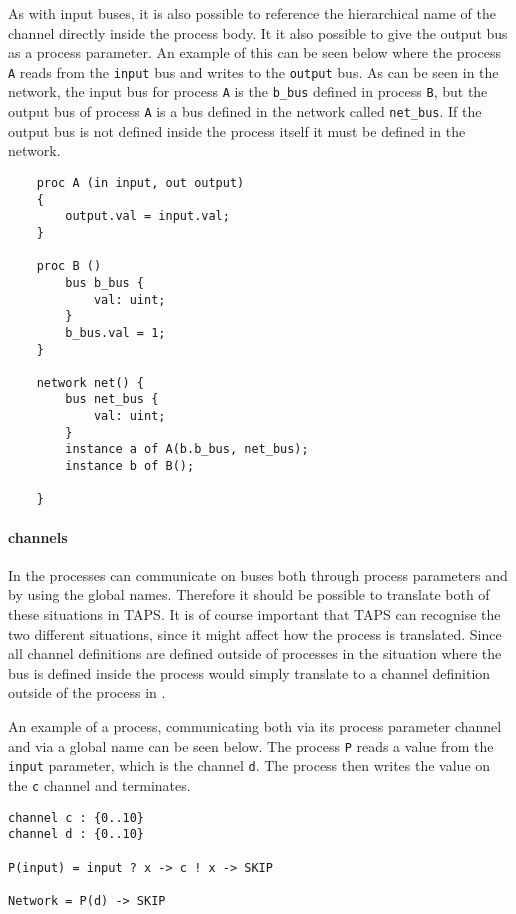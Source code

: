 As with input buses, it is also possible to reference the hierarchical name of the channel directly inside the process body.
It it also possible to give the output bus as a process parameter. An example of this can be seen below where the process \texttt{A} reads from the \texttt{input} bus and writes to the \texttt{output} bus. As can be seen in the network, the input bus for process \texttt{A} is the \texttt{b\_bus} defined in process \texttt{B}, but the output bus of process \texttt{A} is a bus defined in the network called \texttt{net\_bus}. If the output bus is not defined inside the process itself it must be defined in the network.
\begin{verbatim}
    proc A (in input, out output)
    {
        output.val = input.val;
    }

    proc B ()
        bus b_bus {
            val: uint;
        }
        b_bus.val = 1;
    }

    network net() {
        bus net_bus {
            val: uint;
        }
        instance a of A(b.b_bus, net_bus);
        instance b of B();

    }
\end{verbatim}

\paragraph{\cspm{} channels}
In \cspm{} the processes can communicate on buses both through process parameters and by using the global names. Therefore it should be possible to translate both of these situations in TAPS. It is of course important that TAPS can recognise the two different situations, since it might affect how the process is translated. Since all channel definitions are defined outside of processes in \cspm{} the situation where the bus is defined inside the process would simply translate to a channel definition outside of the process in \cspm{}.

An example of a \cspm{} process, communicating both via its process parameter channel and via a global name can be seen below. The process \texttt{P} reads a value from the \texttt{input} parameter, which is the channel \texttt{d}. The process then writes the value on the \texttt{c} channel and terminates.
\begin{verbatim}
channel c : {0..10}
channel d : {0..10}

P(input) = input ? x -> c ! x -> SKIP

Network = P(d) -> SKIP
\end{verbatim}

